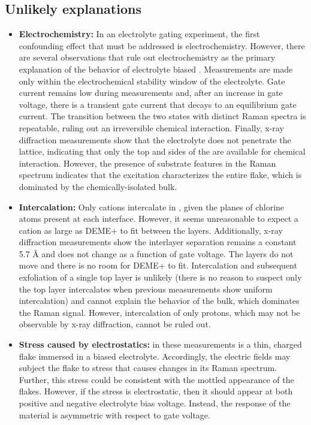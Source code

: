 \subsection{Unlikely explanations}
\begin{itemize}
\item \textbf{Electrochemistry:} In an electrolyte gating experiment, the first confounding effect that must be addressed is electrochemistry. However, there are several observations that rule out electrochemistry as the primary explanation of the behavior of electrolyte biased \ruclnospace . Measurements are made only within the electrochemical stability window of the electrolyte. Gate current remains low during measurements and, after an increase in gate voltage, there is a transient gate current that decays to an equilibrium gate current. The transition between the two states with distinct Raman spectra is repeatable, ruling out an irreversible chemical interaction. Finally, x-ray diffraction measurements show that the electrolyte does not penetrate the \rucl lattice, indicating that only the top and sides of the \rucl are available for chemical interaction. However, the presence of substrate features in the Raman spectrum indicates that the excitation characterizes the entire flake, which is dominated by the chemically-isolated bulk.

\item \textbf{Intercalation:} Only cations intercalate in \ruclnospace , given the planes of chlorine atoms present at each interface. However, it seems unreasonable to expect a cation as large as DEME+ to fit between the layers. Additionally, x-ray diffraction measurements show the interlayer separation remains a constant 5.7 \AA{} and does not change as a function of gate voltage. The layers do not move and there is no room for DEME+ to fit. Intercalation and subsequent exfoliation of a single top layer is unlikely (there is no reason to suspect only the top layer intercalates when previous measurements show uniform intercalation) and cannot explain the behavior of the bulk, which dominates the Raman signal. However, intercalation of only protons, which may not be observable by x-ray diffraction, cannot be ruled out.

\item \textbf{Stress caused by electrostatics:} \rucl in these measurements is a thin, charged flake immersed in a biased electrolyte. Accordingly, the electric fields may subject the flake to stress that causes changes in its Raman spectrum. Further, this stress could be consistent with the mottled appearance of the flakes. However, if the stress is electrostatic, then it should appear at both positive and negative electrolyte bias voltage. Instead, the response of the material is asymmetric with respect to gate voltage.


\end{itemize}
